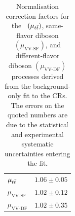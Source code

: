 \begin{table}[!htb]
    \begin{center}
        \caption{
            Normalisation correction factors for the \ttbar~$(\mu_{t\bar{t}})$,
            same-flavor diboson $(\mu_{\text{VV-SF}})$, and different-flavor diboson $(\mu_{\text{VV-DF}})$
            processes derived from the background-only fit to the CRs.
            The errors on the quoted numbers are due to the statistical and experimental systematic uncertainties
            entering the fit.
        }
        \label{tab:stop_scalefactors}
        \begin{tabular}{l|c}
            \hline
            \hline
                $\mu_{t\bar{t}}$ & $1.06 \pm 0.05$ \\
                $\mu_{\text{VV-SF}}$ & $1.02 \pm 0.12$ \\
                $\mu_{\text{VV-DF}}$ & $1.02 \pm 0.35$ \\
            \hline
            \hline
        \end{tabular}
    \end{center}
\end{table}

